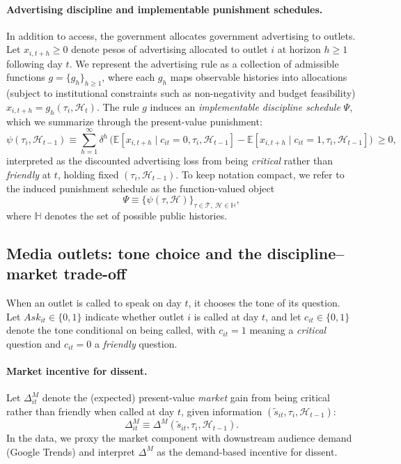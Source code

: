 \documentclass[12pt]{article}
\begin{document}
\paragraph{Advertising discipline and implementable punishment schedules.}
In addition to access, the government allocates government advertising to outlets. Let $x_{i,t+h}\ge 0$ denote pesos of advertising allocated to outlet $i$ at horizon $h\ge 1$ following day $t$. We represent the advertising rule as a collection of admissible functions $g=\{g_h\}_{h\ge 1}$, where each $g_h$ maps observable histories into allocations (subject to institutional constraints such as non-negativity and budget feasibility) $x_{i,t+h}=g_h(\tau_i,\mathcal{H}_{t})$. The rule $g$ induces an \emph{implementable discipline schedule} $\Psi$, which we summarize through the present-value punishment:
\[
\psi(\tau_i,\mathcal{H}_{t-1})
\equiv
\sum_{h=1}^{\infty}\delta^{h}\,
\Big(
\mathbb{E}[x_{i,t+h}\mid c_{it}=0,\tau_i,\mathcal{H}_{t-1}]
-
\mathbb{E}[x_{i,t+h}\mid c_{it}=1,\tau_i,\mathcal{H}_{t-1}]
\Big)\ \ge 0,
\]
interpreted as the discounted advertising loss from being \emph{critical} rather than \emph{friendly} at $t$, holding fixed $(\tau_i,\mathcal{H}_{t-1})$. To keep notation compact, we refer to the induced punishment schedule as the function-valued object
\[
\Psi \equiv \{\psi(\tau,\mathcal{H})\}_{\tau\in\mathcal{T},\ \mathcal{H}\in\mathbb{H}},
\]
where $\mathbb{H}$ denotes the set of possible public histories.

\subsection{Media outlets: tone choice and the discipline--market trade-off}

When an outlet is called to speak on day $t$, it chooses the tone of its question. Let $Ask_{it}\in\{0,1\}$ indicate whether outlet $i$ is called at day $t$, and let $c_{it}\in\{0,1\}$ denote the tone conditional on being called, with $c_{it}=1$ meaning a \emph{critical} question and $c_{it}=0$ a \emph{friendly} question.

\paragraph{Market incentive for dissent.}
Let $\Delta^{M}_{it}$ denote the (expected) present-value \emph{market} gain from being critical rather than friendly when called at day $t$, given information $(\tilde{s}_{it},\tau_i,\mathcal{H}_{t-1})$:
\[
\Delta^{M}_{it}
\equiv
\Delta^{M}(\tilde{s}_{it},\tau_i,\mathcal{H}_{t-1}).
\]
In the data, we proxy the market component with downstream audience demand (Google Trends) and interpret $\Delta^M$ as the demand-based incentive for dissent.
\end{document}
